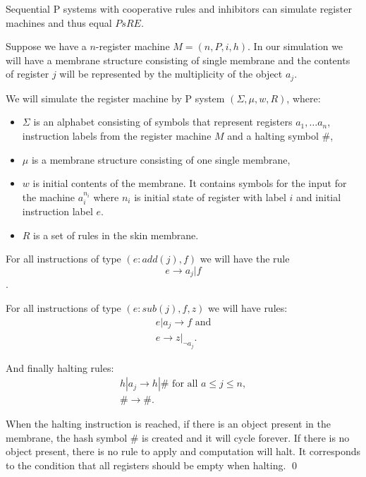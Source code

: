 \begin{veta}
  Sequential P systems with cooperative rules and inhibitors can simulate register machines and thus equal $PsRE$.
\end{veta}


\begin{dokaz}
\label{proof:reg_by_inh}
  Suppose we have a $n$-register machine $M = (n,P,i,h)$. In our simulation we will have a membrane structure consisting of single membrane and the contents of register $j$ will be represented by the multiplicity of the object $a_j$.

  We will simulate the register machine by P system $(\Sigma, \mu, w, R)$, where:
  \begin{itemize}
    \item $\Sigma$ is an alphabet consisting of symbols that represent registers $a_1,\dots a_n$, instruction labels from the register machine $M$ and a halting symbol $\#$,
    \item $\mu$ is a membrane structure consisting of one single membrane,
    \item $w$ is initial contents of the membrane. It contains symbols for the input for the machine $a_i^{n_i}$ where $n_i$ is initial state of register with label $i$ and initial instruction label $e$.
    \item $R$ is a set of rules in the skin membrane.
  \end{itemize}
    
  For all instructions of type $(e : add(j), f)$ we will have the rule $$e \rightarrow a_j|f$$.

  For all instructions of type $(e : sub(j), f, z)$ we will have rules:
  \begin{align*}
    e|a_j \rightarrow f\text{~and}\\
    e \rightarrow z|_{\neg a_j}.
  \end{align*}

  And finally halting rules:
  \begin{align*}
    h|a_j \rightarrow h|\#\text{~for all~}a\leq j\leq n,\\
    \# \rightarrow \#.
  \end{align*}

  When the halting instruction is reached, if there is an object present in the membrane, the hash symbol $\#$ is created and it will cycle forever. If there is no object present, there is no rule to apply and computation will halt. It corresponds to the condition that all registers should be empty when halting. \qed
\end{dokaz}